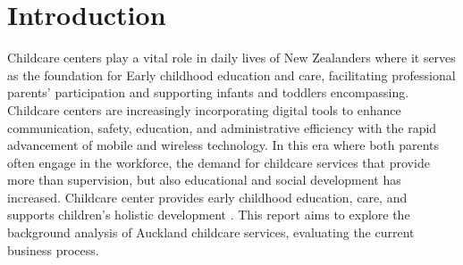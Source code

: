 \section{Introduction}
\par
Childcare centers play a vital role in daily lives of New Zealanders where it serves as the foundation for Early childhood education and care, facilitating professional parents' participation and supporting infants and toddlers encompassing. Childcare centers are increasingly incorporating digital tools to enhance communication, safety, education, and administrative efficiency with the rapid advancement of mobile and wireless technology. In this era where both parents often engage in the workforce, the demand for childcare services that provide more than supervision, but also educational and social development has increased. Childcare center provides early childhood education, care, and supports children’s holistic development \cite{duhn2014making}. This report aims to explore the background analysis of Auckland childcare services, evaluating the current business process. 